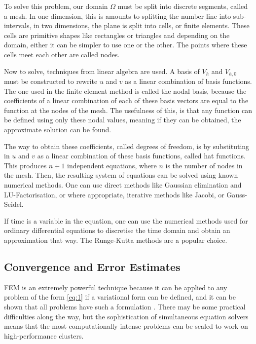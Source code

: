 To solve this problem, our domain $\Omega$ must be split into discrete segments, called a mesh. In one dimension, this is amounts to splitting the number line into sub-intervals, in two dimensions, the plane is split into cells, or finite elements. These cells are primitive shapes like rectangles or triangles and depending on the domain, either it can be simpler to use one or the other. The points where these cells meet each other are called nodes.

Now to solve, techniques from linear algebra are used. A basis of $V_h$ and $V_{h,0}$ must be constructed to rewrite $u$ and $v$ as a linear combination of basis functions. The one used in the finite element method is called the nodal basis, because the coefficients of a linear combination of each of these basis vectors are equal to the function at the nodes of the mesh. The usefulness of this, is that any function can be defined using only these nodal values, meaning if they can be obtained, the approximate solution can be found.

The way to obtain these coefficients, called degrees of freedom, is by substituting in $u$ and $v$ as a linear combination of these basis functions, called hat functions. This produces $n+1$ independent equations, where $n$ is the number of nodes in the mesh. Then, the resulting system of equations can be solved using known numerical methods. One can use direct methods like Gaussian elimination and LU-Factorisation, or where appropriate, iterative methods like Jacobi, or Gauss-Seidel.

If time is a variable in the equation, one can use the numerical methods used for ordinary differential equations to discretise the time domain and obtain an approximation that way. The Runge-Kutta methods are a popular choice.

\subsection{Convergence and Error Estimates} \label{subsection:convergence}

FEM is an extremely powerful technique because it can be applied to any problem of the form \ref{eq:1} if a variational form can be defined, and it can be shown that all problems have such a formulation \cite{e-toni}. There may be some practical difficulties along the way, but the sophistication of simultaneous equation solvers means that the most computationally intense problems can be scaled to work on high-performance clusters.

